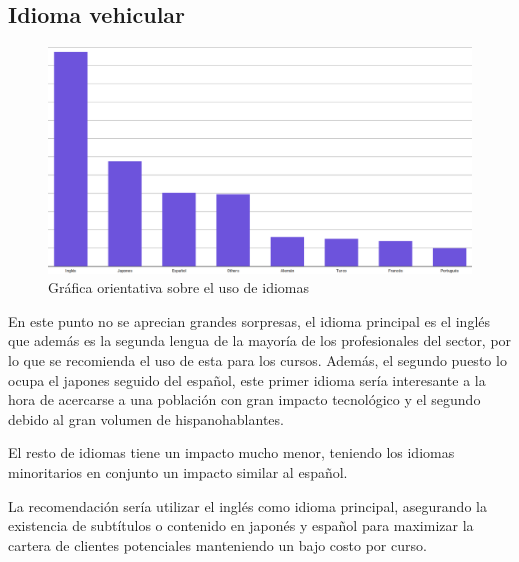 \subsection{Idioma vehicular}
\begin{figure}[htp!]
	\centering
	\caption{Gráfica orientativa sobre el uso de idiomas}
	\label{Idiomas}
	\vspace{5pt}
	\includegraphics[scale=0.355]{graficas/LenguajesBarCorrect2}
\end{figure}

En este punto no se aprecian grandes sorpresas, el idioma principal es el inglés que además es la segunda lengua de la mayoría de los profesionales del sector, por lo que se recomienda el uso de esta para los cursos. Además, el segundo puesto lo ocupa el japones seguido del español, este primer idioma sería interesante a la hora de acercarse a una población con gran impacto tecnológico y el segundo debido al gran volumen de hispanohablantes.

El resto de idiomas tiene un impacto mucho menor, teniendo los idiomas minoritarios en conjunto un impacto similar al español.

La recomendación sería utilizar el inglés como idioma principal, asegurando la existencia de subtítulos o contenido en japonés y español para maximizar la cartera de clientes potenciales manteniendo un bajo costo por curso.